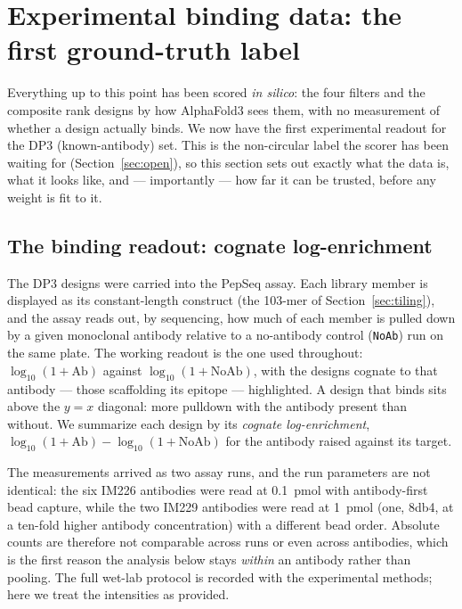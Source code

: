 \section{Experimental binding data: the first ground-truth label}\label{sec:experimental}
Everything up to this point has been scored \emph{in silico}: the four filters and the
composite rank designs by how AlphaFold3 sees them, with no measurement of whether a design
actually binds. We now have the first experimental readout for the DP3 (known-antibody) set.
This is the non-circular label the scorer has been waiting for (Section~\ref{sec:open}), so
this section sets out exactly what the data is, what it looks like, and --- importantly --- how
far it can be trusted, before any weight is fit to it.

\subsection{The binding readout: cognate log-enrichment}
The DP3 designs were carried into the PepSeq assay. Each library member is displayed as its
constant-length construct (the \num{103}-mer of Section~\ref{sec:tiling}), and the assay reads
out, by sequencing, how much of each member is pulled down by a given monoclonal antibody
relative to a no-antibody control (\texttt{NoAb}) run on the same plate. The working readout is
the one used throughout: $\log_{10}(1+\text{Ab})$ against $\log_{10}(1+\text{NoAb})$, with the
designs cognate to that antibody --- those scaffolding its epitope --- highlighted. A design
that binds sits above the $y=x$ diagonal: more pulldown with the antibody present than without.
We summarize each design by its \emph{cognate log-enrichment},
$\log_{10}(1+\text{Ab}) - \log_{10}(1+\text{NoAb})$ for the antibody raised against its target.

The measurements arrived as two assay runs, and the run parameters are not identical: the six
IM226 antibodies were read at \SI{0.1}{\pico\mol} with antibody-first bead capture, while the
two IM229 antibodies were read at \SI{1}{\pico\mol} (one, 8db4, at a ten-fold higher antibody
concentration) with a different bead order. Absolute counts are therefore not comparable across
runs or even across antibodies, which is the first reason the analysis below stays
\emph{within} an antibody rather than pooling. The full wet-lab protocol is recorded with the
experimental methods; here we treat the intensities as provided.

